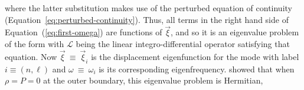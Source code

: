 where the latter substitution makes use of the perturbed equation of continuity (Equation~\ref{eq:perturbed-continuity}). 
%
Thus, all terms in the right hand side of Equation~(\ref{eq:first-omega}) are functions of $\vec\xi$, and so it is an eigenvalue problem of the form
with $\mathcal{L}$ being the linear integro-differential operator satisfying that equation. 
Now ${\vec\xi~\equiv~\vec\xi_i}$ is the displacement eigenfunction for the mode with label ${i\equiv(n,\ell)}$ and ${\omega~\equiv~\omega_i}$ is its corresponding eigenfrequency. 
\citet{1964ApJ...139..664C} 
showed that when $\rho=P=0$ at the outer boundary, this eigenvalue problem is Hermitian, 
